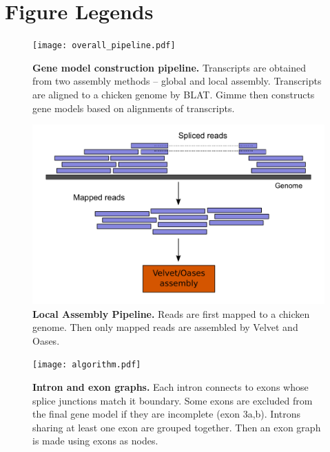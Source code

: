 \documentclass[10pt]{article}
\begin{document}
\section*{Figure Legends}
\begin{figure}[!ht]
\begin{center}
\texttt{[image: overall\_pipeline.pdf]}
\end{center}
\caption{
{\bf Gene model construction pipeline.} Transcripts are obtained from two assembly methods -- global and local assembly.
Transcripts are aligned to a chicken genome by BLAT\@. Gimme then constructs gene models based on alignments of transcripts.
}
\label{overall_pipeline}
\end{figure}

\begin{figure}[!ht]
\begin{center}
\includegraphics[width=5in]{local_assembly}
\end{center}
\caption{
{\bf Local Assembly Pipeline.}
Reads are first mapped to a chicken genome.
Then only mapped reads are assembled by Velvet and Oases.
}
\label{local_assembly}
\end{figure}

\begin{figure}[!ht]
\begin{center}
\texttt{[image: algorithm.pdf]}
\end{center}
\caption{
{\bf Intron and exon graphs.}
Each intron connects to exons whose splice junctions match it boundary.
Some exons are excluded from the final gene model if they are incomplete (exon 3a,b).
Introns sharing at least one exon are grouped together.
Then an exon graph is made using exons as nodes.
}
\label{algorithm}
\end{figure}
\end{document}

